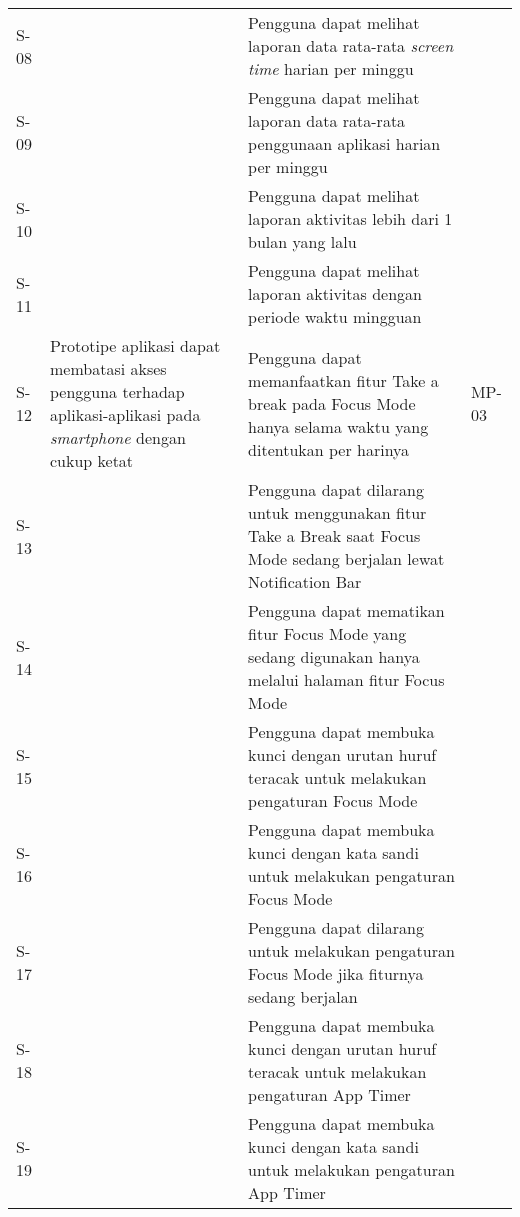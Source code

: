 \begin{small}
\begin{longtable}[c]{|W{c}{0.07\textwidth}|>{\baselineskip=12pt}p{0.3\textwidth}|>{\baselineskip=12pt}p{0.39\textwidth}|>{\centering\arraybackslash\baselineskip=12pt}m{0.11\textwidth}|}
  S-08 &  
  & Pengguna dapat melihat laporan data rata-rata \textit{screen time} harian per minggu 
  & \\  
  
  S-09 &  
  & Pengguna dapat melihat laporan data rata-rata penggunaan aplikasi harian per minggu 
  & \\  
  
  S-10 &  
  & Pengguna dapat melihat laporan aktivitas lebih dari 1 bulan yang lalu
  & \\  
  
  S-11 &  
  & Pengguna dapat melihat laporan aktivitas dengan periode waktu mingguan 
  & \\ \hline
  S-12
  & Prototipe aplikasi dapat membatasi akses pengguna terhadap aplikasi-aplikasi pada \textit{smartphone} dengan cukup ketat
  & Pengguna dapat memanfaatkan fitur Take a break pada Focus Mode hanya selama waktu yang ditentukan per harinya
  & MP-03 \\  
  
  S-13 &  
  & Pengguna dapat dilarang untuk menggunakan fitur Take a Break saat Focus Mode sedang berjalan lewat Notification Bar
  & \\  
  
  S-14 &  
  & Pengguna dapat mematikan fitur Focus Mode yang sedang digunakan hanya melalui halaman fitur Focus Mode
  & \\  
  
  S-15 &  
  & Pengguna dapat membuka kunci dengan urutan huruf teracak untuk melakukan pengaturan Focus Mode
  & \\  
  
  S-16 &  
  & Pengguna dapat membuka kunci dengan kata sandi untuk melakukan pengaturan Focus Mode
  & \\  
  
  S-17 &  
  & Pengguna dapat dilarang untuk melakukan pengaturan Focus Mode jika fiturnya sedang berjalan
  & \\  
  
  S-18 &
  & Pengguna dapat membuka kunci dengan urutan huruf teracak untuk melakukan pengaturan App Timer
  & \\  
  
  S-19 &
  & Pengguna dapat membuka kunci dengan kata sandi untuk melakukan pengaturan App Timer
  & \\  
  

\end{longtable}
\end{small}
